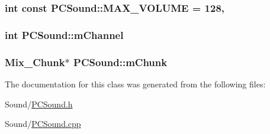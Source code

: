 \subsubsection[{\texorpdfstring{M\+A\+X\+\_\+\+V\+O\+L\+U\+ME}{MAX_VOLUME}}]{\setlength{\rightskip}{0pt plus 5cm}int const P\+C\+Sound\+::\+M\+A\+X\+\_\+\+V\+O\+L\+U\+ME = 128\hspace{0.3cm}{\ttfamily [static]}, {\ttfamily [private]}}\hypertarget{classPCSound_a7f6381192fc1f185fe6e77ff567cfcfa}{}\label{classPCSound_a7f6381192fc1f185fe6e77ff567cfcfa}
\subsubsection[{\texorpdfstring{m\+Channel}{mChannel}}]{\setlength{\rightskip}{0pt plus 5cm}int P\+C\+Sound\+::m\+Channel\hspace{0.3cm}{\ttfamily [private]}}\hypertarget{classPCSound_a77ac270d52beadac024b677bd566b2b7}{}\label{classPCSound_a77ac270d52beadac024b677bd566b2b7}
\subsubsection[{\texorpdfstring{m\+Chunk}{mChunk}}]{\setlength{\rightskip}{0pt plus 5cm}Mix\+\_\+\+Chunk$\ast$ P\+C\+Sound\+::m\+Chunk\hspace{0.3cm}{\ttfamily [private]}}\hypertarget{classPCSound_a83c8c539e699f4e9b4ff97e11a411f4c}{}\label{classPCSound_a83c8c539e699f4e9b4ff97e11a411f4c}


The documentation for this class was generated from the following files\+:\begin{DoxyCompactItemize}
\item 
Sound/\hyperlink{PCSound_8h}{P\+C\+Sound.\+h}\item 
Sound/\hyperlink{PCSound_8cpp}{P\+C\+Sound.\+cpp}\end{DoxyCompactItemize}
